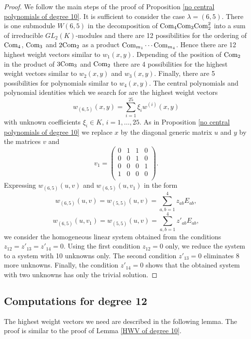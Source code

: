 \documentclass[12pt]{amsart}
\theoremstyle{definition}
\begin{document}
\begin{proof}
We follow the main steps of the proof of Proposition \ref{no central polynomials of degree 10}.
It is sufficient to consider the case $\lambda=(6,5)$.
There is one submodule $W(6,5)$ in the decomposition of $\text{\rm Com}_4\text{\rm Com}_3\text{\rm Com}_2^2$
into a sum of irreducible $GL_2(K)$-modules and there are 12 possibilities for the ordering of
$\text{\rm Com}_4$, $\text{\rm Com}_3$ and $2\text{\rm Com}_2$ as a product $\text{\rm Com}_{m_1}\cdots \text{\rm Com}_{m_4}$.
Hence there are 12 highest weight vectors similar to $w_1(x,y)$.
Depending of the position of $\text{\rm Com}_2$ in the product of $3\text{\rm Com}_3$ and $\text{\rm Com}_2$ there are 4 possibilities
for the highest weight vectors similar to $w_2(x,y)$ and $w_3(x,y)$.
Finally, there are 5 possibilities for polynomials similar to $w_4(x,y)$.
The central polynomials and polynomial identities which we search for are the highest weight vectors
\[
w_{(6,5)}(x,y)=\sum_{i=1}^{25}\xi_iw^{(i)}(x,y)
\]
with unknown coefficients $\xi_i\in K$, $i=1,\ldots,25$. As in Proposition \ref{no central polynomials of degree 10}
we replace $x$ by the diagonal generic matrix $u$ and $y$ by the matrices $v$ and
\[
v_1=\left(\begin{matrix}0&1&1&0\\
0&0&1&0\\
0&0&0&1\\
1&0&0&0\\
\end{matrix}\right).
\]
Expressing $w_{(6,5)}(u,v)$ and $w_{(6,5)}(u,v_1)$ in the form
\[
w_{(6,5)}(u,v)=w_{(5,5)}(u,v)=\sum_{a,b=1}^4z_{ab}E_{ab},
\]
\[
w_{(6,5)}(u,v_1)=w_{(5,5)}(u,v)=\sum_{a,b=1}^4z'_{ab}E_{ab},
\]
we consider the homogeneous linear system obtained from the conditions $z_{12}=z'_{13}=z'_{14}=0$.
Using the first condition $z_{12}=0$ only, we reduce the system to a system with 10 unknowns only. The second condition $z'_{13}=0$
eliminates 8 more unknowns. Finally, the condition $z'_{14}=0$ shows that the obtained system with two unknowns has only the trivial solution.
\end{proof}

\subsection{Computations for degree 12}
The highest weight vectors we need are described in the following lemma.
The proof is similar to the proof of Lemma \ref{HWV of degree 10}.
\end{document}
